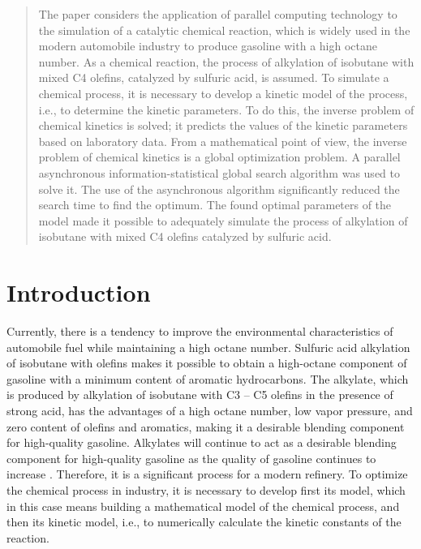 \documentclass{svproc}
\begin{document}
\begin{abstract}

The paper considers the application of parallel computing technology to the simulation of a catalytic chemical reaction, which is widely used in the modern automobile industry to produce gasoline with a high octane number. As a chemical reaction, the process of alkylation of isobutane with mixed C4 olefins, catalyzed by sulfuric acid, is assumed. To simulate a chemical process, it is necessary to develop a kinetic model of the process, i.e., to determine the kinetic parameters. To do this, the inverse problem of chemical kinetics is solved; it predicts the values of the kinetic parameters based on laboratory data. From a mathematical point of view, the inverse problem of chemical kinetics is a global optimization problem. A parallel asynchronous information-statistical global search algorithm was used to solve it. The use of the asynchronous algorithm significantly reduced the search time to find the optimum. The found optimal parameters of the model made it possible to adequately simulate the process of alkylation of isobutane with mixed C4 olefins catalyzed by sulfuric acid.

\end{abstract}

\section{Introduction}

Currently, there is a tendency to improve the environmental characteristics of automobile fuel while maintaining a high octane number. Sulfuric acid alkylation of isobutane with olefins makes it possible to obtain a high-octane component of gasoline with a minimum content of aromatic hydrocarbons. The alkylate, which is produced by alkylation of isobutane with C3 -- C5 olefins in the presence of strong acid, has the advantages of a high octane number, low vapor pressure, and zero content of olefins and aromatics, making it a desirable blending component for high-quality gasoline. Alkylates will continue to act as a desirable blending component for high-quality gasoline as the quality of gasoline continues to increase \cite{cao2019}. Therefore, it is a significant process for a modern refinery. To optimize the chemical process in industry, it is necessary to develop first its model, which in this case means building a mathematical model of the chemical process, and then its kinetic model, i.e., to numerically calculate the kinetic constants of the reaction. 
\end{document}
